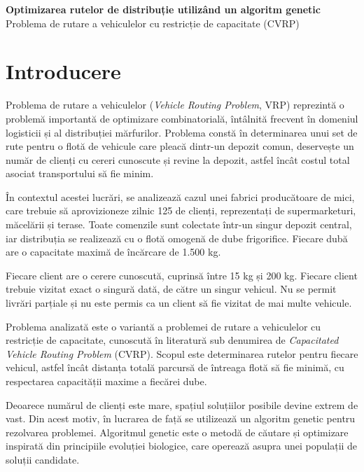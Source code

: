 \documentclass[12pt,a4paper]{article}
\begin{document}
\begin{center}
    {\Large \textbf{Optimizarea rutelor de distribuție utilizând un algoritm genetic}}\\[0.5cm]
    {\large Problema de rutare a vehiculelor cu restricție de capacitate (CVRP)}
\end{center}

\section{Introducere}

Problema de rutare a vehiculelor (\textit{Vehicle Routing Problem}, VRP) reprezintă o problemă importantă de optimizare combinatorială, întâlnită frecvent în domeniul logisticii și al distribuției mărfurilor. Problema constă în determinarea unui set de rute pentru o flotă de vehicule care pleacă dintr-un depozit comun, deservește un număr de clienți cu cereri cunoscute și revine la depozit, astfel încât costul total asociat transportului să fie minim.

În contextul acestei lucrări, se analizează cazul unei fabrici producătoare de mici, care trebuie să aprovizioneze zilnic 125 de clienți, reprezentați de supermarketuri, măcelării și terase. Toate comenzile sunt colectate într-un singur depozit central, iar distribuția se realizează cu o flotă omogenă de dube frigorifice. Fiecare dubă are o capacitate maximă de încărcare de 1.500 kg.

Fiecare client are o cerere cunoscută, cuprinsă între 15 kg și 200 kg. Fiecare client trebuie vizitat exact o singură dată, de către un singur vehicul. Nu se permit livrări parțiale și nu este permis ca un client să fie vizitat de mai multe vehicule.

Problema analizată este o variantă a problemei de rutare a vehiculelor cu restricție de capacitate, cunoscută în literatură sub denumirea de \textit{Capacitated Vehicle Routing Problem} (CVRP). Scopul este determinarea rutelor pentru fiecare vehicul, astfel încât distanța totală parcursă de întreaga flotă să fie minimă, cu respectarea capacității maxime a fiecărei dube.

Deoarece numărul de clienți este mare, spațiul soluțiilor posibile devine extrem de vast. Din acest motiv, în lucrarea de față se utilizează un algoritm genetic pentru rezolvarea problemei. Algoritmul genetic este o metodă de căutare și optimizare inspirată din principiile evoluției biologice, care operează asupra unei populații de soluții candidate.
\end{document}
